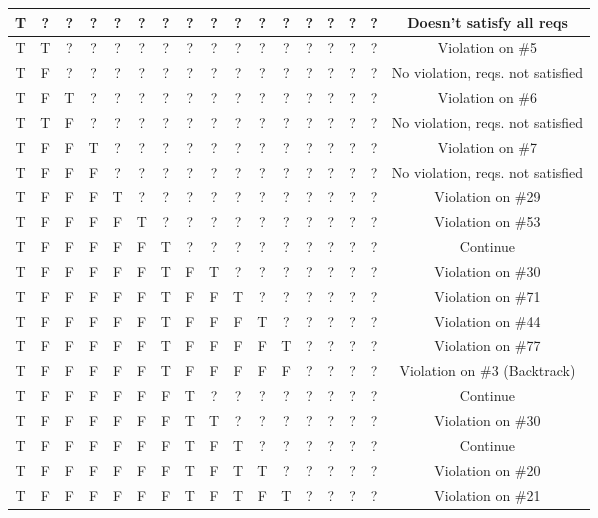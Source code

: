 \documentclass[22pt]{article}
\begin{document}
\begin{table}[htbp]
\begin{tabular}{ |c|c|c|c|c|c|c|c|c|c|c|c|c|c|c|c|c| }
 T & ? & ? & ? & ? & ? & ? & ? & ? & ? & ? & ? & ? & ? & ? & ? & Doesn't satisfy all reqs \\ \hline
 T & T & ? & ? & ? & ? & ? & ? & ? & ? & ? & ? & ? & ? & ? & ? & Violation on \#5 \\ \hline
 T & F & ? & ? & ? & ? & ? & ? & ? & ? & ? & ? & ? & ? & ? & ? & No violation, reqs. not satisfied \\ \hline
 T & F & T & ? & ? & ? & ? & ? & ? & ? & ? & ? & ? & ? & ? & ? & Violation on \#6 \\ \hline
 T & T & F & ? & ? & ? & ? & ? & ? & ? & ? & ? & ? & ? & ? & ? & No violation, reqs. not satisfied \\ \hline
 T & F & F & T & ? & ? & ? & ? & ? & ? & ? & ? & ? & ? & ? & ? & Violation on \#7 \\ \hline
 T & F & F & F & ? & ? & ? & ? & ? & ? & ? & ? & ? & ? & ? & ? & No violation, reqs. not satisfied \\ \hline
 T & F & F & F & T & ? & ? & ? & ? & ? & ? & ? & ? & ? & ? & ? & Violation on \#29 \\ \hline
 T & F & F & F & F & T & ? & ? & ? & ? & ? & ? & ? & ? & ? & ? & Violation on \#53 \\ \hline
 T & F & F & F & F & F & T & ? & ? & ? & ? & ? & ? & ? & ? & ? & Continue \\ \hline
 T & F & F & F & F & F & T & F & T & ? & ? & ? & ? & ? & ? & ? & Violation on \#30 \\ \hline
 T & F & F & F & F & F & T & F & F & T & ? & ? & ? & ? & ? & ? & Violation on \#71 \\ \hline
 T & F & F & F & F & F & T & F & F & F & T & ? & ? & ? & ? & ? & Violation on \#44 \\ \hline
 T & F & F & F & F & F & T & F & F & F & F & T & ? & ? & ? & ? & Violation on \#77 \\ \hline
 T & F & F & F & F & F & T & F & F & F & F & F & ? & ? & ? & ? & Violation on \#3 (Backtrack) \\ \hline
 T & F & F & F & F & F & F & T & ? & ? & ? & ? & ? & ? & ? & ? & Continue \\ \hline
 T & F & F & F & F & F & F & T & T & ? & ? & ? & ? & ? & ? & ? & Violation on \#30 \\ \hline
 T & F & F & F & F & F & F & T & F & T & ? & ? & ? & ? & ? & ? & Continue \\ \hline
 T & F & F & F & F & F & F & T & F & T & T & ? & ? & ? & ? & ? & Violation on \#20 \\ \hline
 T & F & F & F & F & F & F & T & F & T & F & T & ? & ? & ? & ? & Violation on \#21 \\ \hline

\end{tabular}
\end{table}
\end{document}
